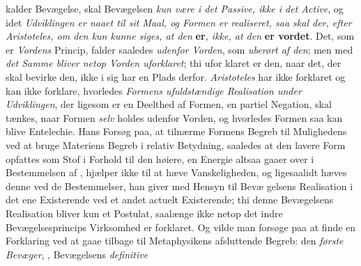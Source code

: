 kalder Bevægelse, skal Bevægelsen \emph{kun være i det Passive,
ikke i det Active}, og idet \emph{Udviklingen er naaet til sit
Maal, og Formen er realiseret, saa skal der, efter
Aristoteles, om den kun kunne siges, at den} \textbf{er}\emph{, ikke,
at den} \textbf{er vordet}. Det, som er \emph{Vordens} Princip, falder
saaledes \emph{udenfor Vorden}, som \emph{uberørt af den}; men med
\emph{det Samme bliver netop Vorden uforklaret}; thi ufor\-%
klaret er den, naar det, der skal bevirke den, ikke i sig har
en Plads derfor. \emph{Aristoteles} har ikke forklaret og kan ikke
forklare, hvorledes \emph{Formens ufuldstændige Realisation
under Udviklingen}, der ligesom er en Deelthed af Formen,
en partiel Negation, skal tænkes, naar Formen \emph{selv} holdes
udenfor Vorden, og hvorledes Formen saa kan blive Entelechie.
Hans Forsøg paa, at tilnærme Formens Begreb til Mulighedens
ved at bruge Materiens Begreb i relativ Betydning, saaledes
at den lavere Form opfattes som Stof i Forhold til den høiere,
en Energie altsaa gaaer over i Bestemmelsen af ,
hjælper ikke til at hæve Vanskeligheden, og ligesaalidt hæves
denne ved de Bestemmelser, han giver med Hensyn til Bevæ\-%
gelsens Realisation i det ene Existerende ved et andet actuelt
Existerende; thi denne Bevægelsens Realisation bliver kun et
Postulat, saalænge ikke netop det indre Bevægelsesprincips
Virksomhed er forklaret. Og vilde man forsøge paa at finde
en Forklaring ved at gaae tilbage til Metaphysikens afsluttende
Begreb: den \emph{første Bevæger}, , Bevægelsens \emph{definitive}
